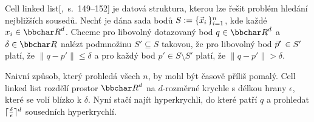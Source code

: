Cell linked list[,~s.~149--152] je datová struktura, kterou lze řešit problém hledání nejbližších sousedů. Nechť je dána sada bodů $S := \{{\vec x_i\,}\}_{i = 1}^n$, kde každé $x_i \in \reals^d$. Chceme pro libovolný dotazovaný bod $q \in \reals^d$ a $\delta \in \reals$ nalézt podmnožinu $S' \subseteq S$ takovou, že pro libovolný bod ${\vec p'\,} \in S'$ platí, že $\|q - p'\| \leq \delta$ a pro každý bod $p' \in S \setminus S'$ platí, že $\|q - p'\| > \delta$.

Naivní způsob, který prohledá všech $n$, by mohl být časově příliš pomalý. Cell linked list rozdělí prostor $\reals^d$ na $d$-rozměrné krychle s délkou hrany $\epsilon$, které se volí blízko k $\delta$. Nyní stačí najít hyperkrychli, do které patří $q$ a prohledat $\lceil {\delta \over \epsilon} \rceil^d$ sousedních hyperkrychlí.


